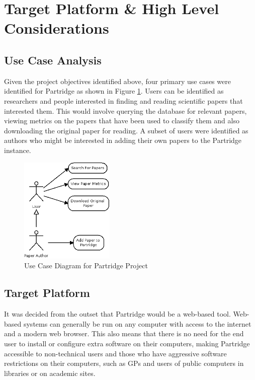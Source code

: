 %
%



\section{ Target Platform \& High Level Considerations }

\subsection{Use Case Analysis}

Given the project objectives identified above, four primary use cases were
identified for Partridge as shown in Figure \ref{fig:use_cases}. Users can be
identified as researchers and people interested in finding and reading
scientific papers that interested them. This would involve querying the
database for relevant papers, viewing metrics on the papers that have been used
to classify them and also downloading the original paper for reading. A subset
of users were identified as authors who might be interested in adding their own
papers to the Partridge instance.

\begin{figure}[!h]
\centering
\includegraphics[width=0.4\textwidth]{images/design/use_cases.png}
\caption{Use Case Diagram for Partridge Project}
\label{fig:use_cases}
\end{figure}

\subsection{ Target Platform}

It was decided from the outset that Partridge would be a web-based tool.
Web-based systems can generally be run on any computer with access to the
internet and a modern web browser. This also means that there is no need for
the end user to install or configure extra software on their computers, making
Partridge accessible to non-technical users and those who have aggressive
software restrictions on their computers, such as GPs and users of public
computers in libraries or on academic sites.

